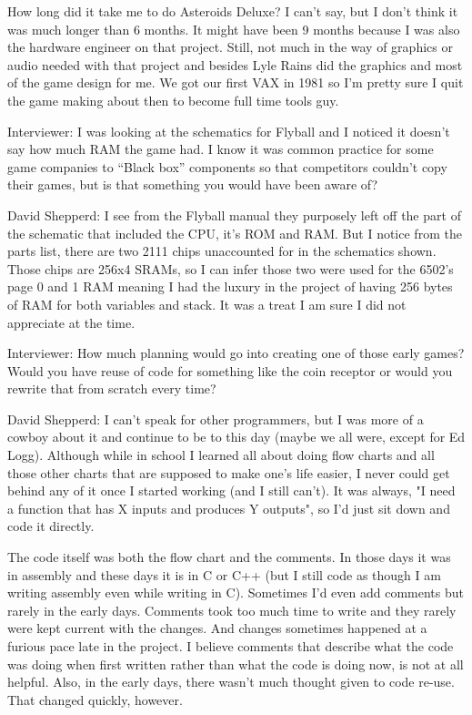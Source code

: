 How long did it take me to do Asteroids Deluxe? I can't say, but I don't think it was much longer than 6 months. It might have been 9 months because I was also the hardware engineer on that project. Still, not much in the way of graphics or audio needed with that project and besides Lyle Rains did the graphics and most of the game design for me. We got our first VAX in 1981 so I'm pretty sure I quit the game making about then to become full time tools guy.

\textcolor{interviewer}{Interviewer:} I was looking at the schematics for Flyball and I noticed it doesn’t say how much RAM the game had. I know it was common practice for some game companies to “Black box” components so that competitors couldn’t copy their games, but is that something you would have been aware of?

\textcolor{interviewee}{David Shepperd:} I see from the Flyball manual they purposely left off the part of the schematic that included the CPU, it's ROM and RAM. But I notice from the parts list, there are two 2111 chips unaccounted for in the schematics shown. Those chips are 256x4 SRAMs, so I can infer those two were used for the 6502's page 0 and 1 RAM meaning I had the luxury in the project of having 256 bytes of RAM for both variables and stack. It was a treat I am sure I did not appreciate at the time. 

\textcolor{interviewer}{Interviewer:} How much planning would go into creating one of those early games? Would you have reuse of code for something like the coin receptor or would you rewrite that from scratch every time?

\textcolor{interviewee}{David Shepperd:} I can't speak for other programmers, but I was more of a cowboy about it and continue to be to this day (maybe we all were, except for Ed Logg). Although while in school I learned all about doing flow charts and all those other charts that are supposed to make one's life easier, I never could get behind any of it once I started working (and I still can't). It was always, "I need a function that has X inputs and produces Y outputs", so I'd just sit down and code it directly. 

The code itself was both the flow chart and the comments. In those days it was in assembly and these days it is in C or C++ (but I still code as though I am writing assembly even while writing in C). Sometimes I'd even add comments but rarely in the early days. Comments took too much time to write and they rarely were kept current with the changes. And changes sometimes happened at a furious pace late in the project. I believe comments that describe what the code was doing when first written rather than what the code is doing now, is not at all helpful. Also, in the early days, there wasn't much thought given to code re-use. That changed quickly, however.

